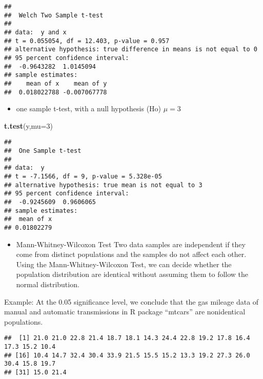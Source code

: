 \documentclass[
]{article}
\newenvironment{Shaded}{\begin{snugshade}}{\end{snugshade}}
\newcommand{\DataTypeTok}[1]{\textcolor[rgb]{0.13,0.29,0.53}{#1}}
\newcommand{\DecValTok}[1]{\textcolor[rgb]{0.00,0.00,0.81}{#1}}
\newcommand{\KeywordTok}[1]{\textcolor[rgb]{0.13,0.29,0.53}{\textbf{#1}}}
\newcommand{\NormalTok}[1]{#1}
\newcommand{\OperatorTok}[1]{\textcolor[rgb]{0.81,0.36,0.00}{\textbf{#1}}}
\providecommand{\tightlist}{%
  \setlength{\itemsep}{0pt}\setlength{\parskip}{0pt}}
\begin{document}
\begin{verbatim}
## 
##  Welch Two Sample t-test
## 
## data:  y and x
## t = 0.055054, df = 12.403, p-value = 0.957
## alternative hypothesis: true difference in means is not equal to 0
## 95 percent confidence interval:
##  -0.9643282  1.0145094
## sample estimates:
##    mean of x    mean of y 
##  0.018022788 -0.007067778
\end{verbatim}

\begin{itemize}
\tightlist
\item
  one sample t-test, with a null hypothesis (Ho) \(\mu=3\)
\end{itemize}

\begin{Shaded}
\begin{Highlighting}[]
\KeywordTok{t.test}\NormalTok{(y,}\DataTypeTok{mu=}\DecValTok{3}\NormalTok{) }
\end{Highlighting}
\end{Shaded}

\begin{verbatim}
## 
##  One Sample t-test
## 
## data:  y
## t = -7.1566, df = 9, p-value = 5.328e-05
## alternative hypothesis: true mean is not equal to 3
## 95 percent confidence interval:
##  -0.9245609  0.9606065
## sample estimates:
##  mean of x 
## 0.01802279
\end{verbatim}

\begin{itemize}
\tightlist
\item
  Mann-Whitney-Wilcoxon Test Two data samples are independent if they
  come from distinct populations and the samples do not affect each
  other. Using the Mann-Whitney-Wilcoxon Test, we can decide whether the
  population distribution are identical without assuming them to follow
  the normal distribution.
\end{itemize}

Example: At the 0.05 significance level, we conclude that the gas
mileage data of manual and automatic transmissions in R package
``mtcars'' are nonidentical populations.

\begin{Shaded}
\end{Shaded}

\begin{verbatim}
##  [1] 21.0 21.0 22.8 21.4 18.7 18.1 14.3 24.4 22.8 19.2 17.8 16.4 17.3 15.2 10.4
## [16] 10.4 14.7 32.4 30.4 33.9 21.5 15.5 15.2 13.3 19.2 27.3 26.0 30.4 15.8 19.7
## [31] 15.0 21.4
\end{verbatim}
\end{document}
